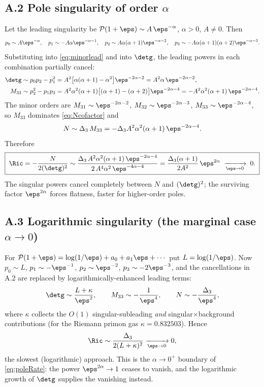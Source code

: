\subsection*{A.2 Pole singularity of order $\alpha$}

Let the leading singularity be $\mathcal P(1+\eps)\sim A\,\eps^{-\alpha}$, $\alpha>0$, $A\ne0$. Then
\[
   p_0\sim A\eps^{-\alpha},\quad p_1\sim-A\alpha\eps^{-\alpha-1},\quad
   p_2\sim A\alpha(\alpha+1)\eps^{-\alpha-2},\quad p_3\sim-A\alpha(\alpha+1)(\alpha+2)\eps^{-\alpha-3}.
\]
Substituting into \eqref{eq:minorlead} and into $\detg$, the leading powers in each
combination partially cancel:
\begin{align*}
   \detg &\sim p_0p_2-p_1^2=A^2\big[\alpha(\alpha+1)-\alpha^2\big]\eps^{-2\alpha-2}
          =A^2\alpha\,\eps^{-2\alpha-2},\\[2pt]
   M_{33}&\sim p_2^2-p_1p_3=A^2\alpha^2(\alpha+1)\big[(\alpha+1)-(\alpha+2)\big]\eps^{-2\alpha-4}
          =-A^2\alpha^2(\alpha+1)\,\eps^{-2\alpha-4}.
\end{align*}
The minor orders are $M_{31}\sim\eps^{-2\alpha-2}$, $M_{32}\sim\eps^{-2\alpha-3}$,
$M_{33}\sim\eps^{-2\alpha-4}$, so $M_{33}$ dominates \eqref{eq:Ncofactor} and
\[
   N\sim\Delta_3\,M_{33}=-\Delta_3A^2\alpha^2(\alpha+1)\,\eps^{-2\alpha-4}.
\]
Therefore
\begin{equation}\label{eq:poleRate}
   \boxed{\;\Ric=-\frac{N}{2(\detg)^2}
   \sim\frac{\Delta_3\,A^2\alpha^2(\alpha+1)\,\eps^{-2\alpha-4}}{2\,A^4\alpha^2\,\eps^{-4\alpha-4}}
   =\frac{\Delta_3(\alpha+1)}{2A^2}\,\eps^{2\alpha}\;\xrightarrow[\eps\to0]{}\;0.\;}
\end{equation}
The singular powers cancel completely between $N$ and $(\detg)^2$; the surviving factor
$\eps^{2\alpha}$ forces flatness, faster for higher-order poles.

\subsection*{A.3 Logarithmic singularity (the marginal case $\alpha\to0$)}

For $\mathcal P(1+\eps)=\log(1/\eps)+a_0+a_1\eps+\cdots$ put $L=\log(1/\eps)$. Now
$p_0\sim L$, $p_1\sim-\eps^{-1}$, $p_2\sim\eps^{-2}$, $p_3\sim-2\eps^{-3}$, and the cancellations
in A.2 are replaced by logarithmically-enhanced leading terms:
\[
   \detg\sim\frac{L+\kappa}{\eps^{2}},\qquad M_{33}\sim-\frac{1}{\eps^{4}},\qquad
   N\sim-\frac{\Delta_3}{\eps^{4}},
\]
where $\kappa$ collects the $O(1)$ singular-subleading \emph{and} singular$\times$background
contributions (for the Riemann primon gas $\kappa=0.832503$). Hence
\begin{equation}\label{eq:logRate}
   \Ric\sim\frac{\Delta_3}{2(L+\kappa)^2}\xrightarrow[\eps\to0]{}0,
\end{equation}
the slowest (logarithmic) approach. This is the $\alpha\to0^{+}$ boundary of \eqref{eq:poleRate}:
the power $\eps^{2\alpha}\to1$ ceases to vanish, and the logarithmic growth of $\detg$ supplies
the vanishing instead.

